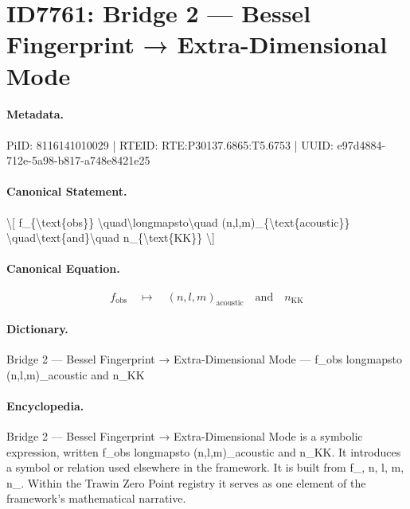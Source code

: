 \section*{ID7761: Bridge 2 — Bessel Fingerprint → Extra-Dimensional Mode}
\paragraph{Metadata.}
PiID: 8116141010029 | RTEID: RTE:P30137.6865:T5.6753 | UUID: e97d4884-712e-5a98-b817-a748e8421e25

\paragraph{Canonical Statement.}
\textbackslash{}[ f\_\{\textbackslash{}text\{obs\}\} \textbackslash{}quad\textbackslash{}longmapsto\textbackslash{}quad (n,l,m)\_\{\textbackslash{}text\{acoustic\}\} \textbackslash{}quad\textbackslash{}text\{and\}\textbackslash{}quad n\_\{\textbackslash{}text\{KK\}\} \textbackslash{}]

\paragraph{Canonical Equation.}
\[
f_{\text{obs}} \quad\longmapsto\quad (n,l,m)_{\text{acoustic}} \quad\text{and}\quad n_{\text{KK}}
\]

\paragraph{Dictionary.}
Bridge 2 — Bessel Fingerprint → Extra-Dimensional Mode — f\_obs longmapsto (n,l,m)\_acoustic and n\_KK

\paragraph{Encyclopedia.}
Bridge 2 — Bessel Fingerprint → Extra-Dimensional Mode is a symbolic expression, written f\_obs longmapsto (n,l,m)\_acoustic and n\_KK. It introduces a symbol or relation used elsewhere in the framework. It is built from f\_, n, l, m, n\_. Within the Trawin Zero Point registry it serves as one element of the framework's mathematical narrative.
